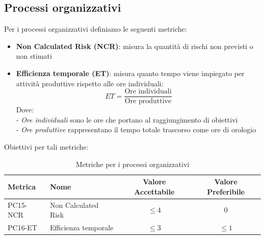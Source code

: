 \documentclass[a4paper,10pt]{article}
\begin{document}
\subsection{Processi organizzativi}
Per i processi organizzativi definiamo le seguenti metriche:
\begin{itemize}
    \item \textbf{Non Calculated Risk (NCR)}: misura la quantità di rischi non previsti o non stimati
    \item \textbf{Efficienza temporale (ET)}: misura quanto tempo viene impiegato per attività produttive rispetto alle ore individuali:
    \[
    ET = \frac{\text{Ore individuali}}{\text{Ore produttive}}
    \]
    Dove: \\
    - \textit{Ore individuali} sono le ore che portano al raggiungimento di obiettivi \\
    - \textit{Ore produttive} rappresentano il tempo totale trascorso come ore di orologio
\end{itemize}
Obiettivi per tali metriche:
\begin{table}[H]
\centering
\renewcommand{\arraystretch}{1.2}
\begin{tabular}{|l|l|c|c|}
\hline
\textbf{Metrica} & \textbf{Nome} & \textbf{Valore Accettabile} & \textbf{Valore Preferibile} \\
\hline
PC15-NCR & Non Calculated Risk & $\leq 4$ & 0 \\
PC16-ET  & Efficienza temporale  & $\leq 3$ & $\leq 1$ \\
\hline
\end{tabular}
\caption{Metriche per i processi organizzativi}
\label{tab:metriche-organizzativi}
\end{table}
\end{document}
